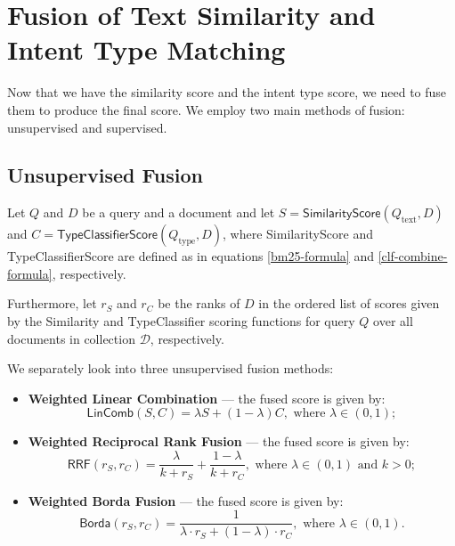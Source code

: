 \section{Fusion of Text Similarity and Intent Type Matching}
Now that we have the similarity score and the intent type score, we need to fuse them to produce the final score.
We employ two main methods of fusion: unsupervised and supervised.

\subsection{Unsupervised Fusion}
Let $Q$ and $D$ be a query and a document and let $S=\textsf{SimilarityScore}(Q_{\text{text}}, D)$
and $C=\textsf{TypeClassifierScore}(Q_{\text{type}}, D)$, where \textsf{SimilarityScore} and \textsf{TypeClassifierScore}
are defined as in equations \ref{bm25-formula} and \ref{clf-combine-formula}, respectively.

Furthermore, let $r_S$ and $r_C$ be the ranks of $D$ in the ordered list of scores given by the
\textsf{Similarity} and \textsf{TypeClassifier} scoring functions for query $Q$ over all documents in collection $\mathcal{D}$,
respectively.

We separately look into three unsupervised fusion methods:
\begin{itemize}

 \item \textbf{Weighted Linear Combination} --- the fused score is given by: 
 \begin{equation} \label{interp-formula}
 \textsf{LinComb}(S, C) = \lambda S + (1-\lambda) C, \text{ where } \lambda \in (0,1);
 \end{equation}

\item \textbf{Weighted Reciprocal Rank Fusion} --- the fused score is given by:
 \begin{equation}\label{rrf-formula}
  \textsf{RRF}(r_S, r_C) =  \displaystyle\frac{\lambda}{k + r_S} + \displaystyle\frac{1- \lambda}{k + r_C},  \text{ where } \lambda \in (0,1)
  \text{ and } k>0;
 \end{equation}
 
 \item \textbf{Weighted Borda Fusion} ---  the fused score is given by:
 \begin{equation}\label{borda-formula}
   \textsf{Borda}(r_S, r_C) =  \displaystyle\frac{1}{\lambda \cdot r_S + (1-\lambda)\cdot r_C},  \text{ where } \lambda \in (0,1).
 \end{equation}
  \end{itemize}

